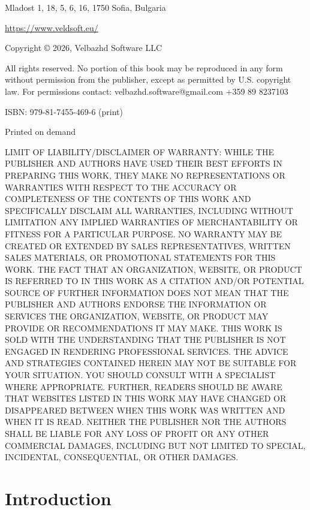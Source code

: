 \documentclass[12pt,twoside,openany]{book}
\begin{document}
Mladost 1, 18, 5, 6, 16, 1750 Sofia, Bulgaria

\url{https://www.veldsoft.eu/}

\vspace*{0.25in}
Copyright © 2026, Velbazhd Software LLC

\vspace*{0.25in}
All rights reserved. No portion of this book may be reproduced in any form without permission from the publisher, except as permitted by U.S. copyright law. For permissions contact: velbazhd.software@gmail.com +359 89 8237103

\vspace*{0.25in}
ISBN: 979-81-7455-469-6 (print)

Printed on demand
\clearpage

\tableofcontents
\listoffigures
\listoftables
\lstlistoflistings

\clearpage
\thispagestyle{empty} 
\pagestyle{empty}
LIMIT OF LIABILITY/DISCLAIMER OF WARRANTY: WHILE THE PUBLISHER AND AUTHORS HAVE USED THEIR BEST EFFORTS IN PREPARING THIS WORK, THEY MAKE NO REPRESENTATIONS OR WARRANTIES WITH RESPECT TO THE ACCURACY OR COMPLETENESS OF THE CONTENTS OF THIS WORK AND SPECIFICALLY DISCLAIM ALL WARRANTIES, INCLUDING WITHOUT LIMITATION ANY IMPLIED WARRANTIES OF MERCHANTABILITY OR FITNESS FOR A PARTICULAR PURPOSE. NO WARRANTY MAY BE CREATED OR EXTENDED BY SALES REPRESENTATIVES, WRITTEN SALES MATERIALS, OR PROMOTIONAL STATEMENTS FOR THIS WORK. THE FACT THAT AN ORGANIZATION, WEBSITE, OR PRODUCT IS REFERRED TO IN THIS WORK AS A CITATION AND/OR POTENTIAL SOURCE OF FURTHER INFORMATION DOES NOT MEAN THAT THE PUBLISHER AND AUTHORS ENDORSE THE INFORMATION OR SERVICES THE ORGANIZATION, WEBSITE, OR PRODUCT MAY PROVIDE OR RECOMMENDATIONS IT MAY MAKE. THIS WORK IS SOLD WITH THE UNDERSTANDING THAT THE PUBLISHER IS NOT ENGAGED IN RENDERING PROFESSIONAL SERVICES. THE ADVICE AND STRATEGIES CONTAINED HEREIN MAY NOT BE SUITABLE FOR YOUR SITUATION. YOU SHOULD CONSULT WITH A SPECIALIST WHERE APPROPRIATE. FURTHER, READERS SHOULD BE AWARE THAT WEBSITES LISTED IN THIS WORK MAY HAVE CHANGED OR DISAPPEARED BETWEEN WHEN THIS WORK WAS WRITTEN AND WHEN IT IS READ. NEITHER THE PUBLISHER NOR THE AUTHORS SHALL BE LIABLE FOR ANY LOSS OF PROFIT OR ANY OTHER COMMERCIAL DAMAGES, INCLUDING BUT NOT LIMITED TO SPECIAL, INCIDENTAL, CONSEQUENTIAL, OR OTHER DAMAGES.

\mainmatter

\pagestyle{fancy}

\chapter{Introduction}
\end{document}
